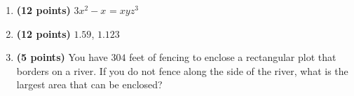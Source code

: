 \documentclass[12pt]{amsart}
\begin{document}
\begin{enumerate}
\vfill 
\def \a{7}\def \atwoone{3}\def \atwotwo{5}\def \atwothree{1}\def \btwothree{9}\def \sumtwothree{10}\def \diftwothree{-8}\def \bigtwothree{100}\def \powtwothree{9}\def \logtwothree{0.0}\def \factortwothree{209}\def \atwofour{1.14}\def \btwofour{1.772}\def \tooshorttwofour{10.1}\def \moneytwofour{10.10}\def \longertwofour{10.10000}\def \atwofive{0.12}\def \btwofive{0.12346}\def \athreeone{4}\def \bthreeone{6}\def \setthreetwo{[2, 5, 6]}\def \athreetwo{2}\def \bthreetwo{5}\def \cthreetwo{6}\def \controlthreethree{4}\def \athreethree{1}\def \topthreethree{1}\def \athreefour{5}\def \bthreefour{3}\def \listthreefour{[1, 2, 3, 4]}\def \afourone{16}\def \bfourone{4}\def \fracfourone{4}\def \rootfourtwo{20}\def \simplifiedfourtwo{2 \sqrt{5}}\def \sqrtlistfourtwo{[2, 5]}\def \outfourtwo{2}\def \infourtwo{5}\def \wowfourtwo{1}\def \afourthree{0}\def \nicethreefour{3x^{2}-x^{}}\def \nastythreefour{xyz^{3}}\def \cfourthree{-4}\def \dfourthree{9}\def \infourthree{-4x^{}}\def \outfourthree{+9y^{}}\def \afourfour{1243147}\def \nicefourfour{1,243,147}\def \goodfourfour{1,000,000.12345}\def \badfourfour{1,000,000.1}
\item {\bf (12 points)} 
  $\nicethreefour = \nastythreefour$ 
\vfill 
\def \a{7}\def \atwoone{1}\def \atwotwo{3}\def \atwothree{4}\def \btwothree{6}\def \sumtwothree{10}\def \diftwothree{-2}\def \bigtwothree{400}\def \powtwothree{1296}\def \logtwothree{0.7737056144690831}\def \factortwothree{34}\def \atwofour{1.59}\def \btwofour{1.123}\def \tooshorttwofour{10.1}\def \moneytwofour{10.10}\def \longertwofour{10.10000}\def \atwofive{0.12}\def \btwofive{0.12346}\def \athreeone{6}\def \bthreeone{4}\def \setthreetwo{[3, 7, 7]}\def \athreetwo{3}\def \bthreetwo{7}\def \cthreetwo{7}\def \controlthreethree{-8}\def \athreethree{4}\def \topthreethree{0}\def \athreefour{3}\def \bthreefour{1}\def \listthreefour{[1, 2, 4, 5]}\def \afourone{4}\def \bfourone{-8}\def \fracfourone{\frac{-1}{2}}\def \rootfourtwo{20}\def \simplifiedfourtwo{2 \sqrt{5}}\def \sqrtlistfourtwo{[2, 5]}\def \outfourtwo{2}\def \infourtwo{5}\def \wowfourtwo{1}\def \afourthree{5}\def \nicethreefour{3x^{2}-x^{}+5}\def \nastythreefour{xyz^{3}+5}\def \cfourthree{-4}\def \dfourthree{-9}\def \infourthree{-4x^{}}\def \outfourthree{-9y^{}}\def \afourfour{1576084}\def \nicefourfour{1,576,084}\def \goodfourfour{1,000,000.12345}\def \badfourfour{1,000,000.1}
\item {\bf (12 points)} 
 $\atwofour$, $\btwofour$ 
\vfill 
\newpage\def \x{76}\def \y{152}\def \L{304}\def \area{11552}
\item {\bf (5 points)} 
 You have $\L$ feet of fencing to enclose a rectangular plot that borders on a river. If you do not fence along the side of the river, what is the largest area that can be enclosed? \\


\end{enumerate}
\end{document}
